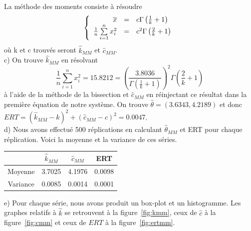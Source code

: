 La méthode des moments consiste à résoudre
\[
\left\{
\begin{array}{r c l}
\overline{x}  &=& c\Gamma\left(\frac{1}{k}+1\right)\\
\frac{1}{n}\sum\limits_{i=1}^n x_i ^2 &=& c^2\Gamma\left(\frac{2}{k}+1\right)
\end{array}
\right.
\]
où k et c trouvés seront $\hat{k}_{MM}$ et $\hat{c}_{MM}$.\\

c) On trouve $\hat{k}_{MM}$ en résolvant 
$$ \frac{1}{n}\sum\limits_{i=1}^n x_i ^2 = 15.8212 = \left(\frac{3.8036}{\Gamma\left(\frac{1}{k}+1\right)}\right)^2\Gamma\left(\frac{2}{k}+1\right)$$
à l'aide de la méthode de la bissection et $\hat{c}_{MM}$ en réinjectant ce résultat dans la première équation de notre système. On trouve $\hat{\theta} = (3.6343,4.2189)$ et donc $ERT = (\hat{k}_{MM} - k)^2 +(\hat{c}_{MM} - c)^2 = 0.0047$. \\

d) Nous avons effectué 500 réplications en calculant $\hat{\theta}_{MM}$ et ERT pour chaque réplication. Voici la moyenne et la variance de ces séries.
\begin{center}
\begin{tabular}{|c|c|c|c|}
  \hline
   &  $\hat{k}_{MM}$ & $\hat{c}_{MM}$ & ERT \\
  \hline
  Moyenne & 3.7025 & 4.1976 & 0.0098 \\
  Variance & 0.0085 & 0.0014 & 0.0001 \\
  \hline
\end{tabular}
\end{center}

e) Pour chaque série, nous avons produit un box-plot et un histogramme. Les graphes relatifs à $\hat{k}$ se retrouvent à la figure~\ref{fig:kmm}, ceux de $\hat{c}$ à la figure~\ref{fig:cmm} et ceux de $ERT$ à la figure~\ref{fig:ertmm}.\\

